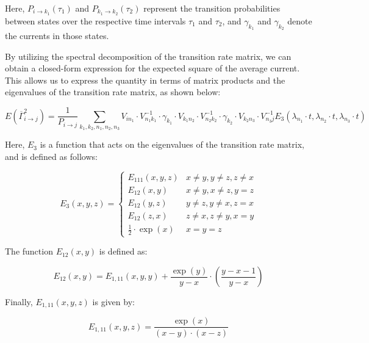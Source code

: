 \documentclass[pdflatex,sn-mathphys-num]{sn-jnl}%
\theoremstyle{thmstyleone}%
\theoremstyle{thmstyletwo}%
\theoremstyle{thmstylethree}%
\begin{document}
Here, \(P_{i \rightarrow k_1}(\tau_1)\) and \(P_{k_1 \rightarrow k_2}(\tau_2)\) represent the transition probabilities between states over the respective time intervals \(\tau_1\) and \(\tau_2\), and \(\gamma_{k_1}\) and \(\gamma_{k_2}\) denote the currents in those states.


By utilizing the spectral decomposition of the transition rate matrix, we can obtain a closed-form expression for the expected square of the average current. This allows us to express the quantity in terms of matrix products and the eigenvalues of the transition rate matrix, as shown below:

\begin{equation}
	E(\overline{\Gamma}_{i \rightarrow j}^2) = \frac{1}{P_{i \rightarrow j}} \sum_{k_1, k_2, n_1, n_2, n_3} V_{i n_1} \cdot V^{-1}_{n_1 k_1} \cdot \gamma_{k_1} \cdot V_{k_1 n_2} \cdot V^{-1}_{n_2 k_2} \cdot \gamma_{k_2} \cdot V_{k_2 n_3} \cdot V^{-1}_{n_3 j} E_3(\lambda_{n_1} \cdot t, \lambda_{n_2} \cdot t, \lambda_{n_3} \cdot t)
    \label{eq:sqr_gamma_formula}
\end{equation}

Here, \(E_3\) is a function that acts on the eigenvalues of the transition rate matrix, and is defined as follows:

\begin{equation}
	E_3(x,y,z)= 
	\begin{cases}
		E_{111}(x,y,z) & x\neq y, y\neq z, z\neq x \\
		E_{12}(x,y) & x\neq y, x\neq z, y = z \\
		E_{12}(y,z) & y\neq z, y\neq x, z = x \\
		E_{12}(z,x) & z\neq x, z\neq y, x = y \\
		\frac{1}{2} \cdot \exp(x) & x=y=z
	\end{cases}
	\label{eq:E_3}
\end{equation}

The function \(E_{12}(x, y)\) is defined as:

\begin{equation}
	E_{12}(x,y) = E_{1,11}(x, y, y) + \frac{\exp(y)}{y - x} \cdot \left(\frac{y - x - 1}{y - x}\right)
	\label{eq:E_12}
\end{equation}

Finally, \(E_{1,11}(x, y, z)\) is given by:

\begin{equation}
	E_{1,11}(x, y, z) = \frac{\exp(x)}{(x - y) \cdot (x - z)}
	\label{eq:E_1_11}
\end{equation}
\end{document}

